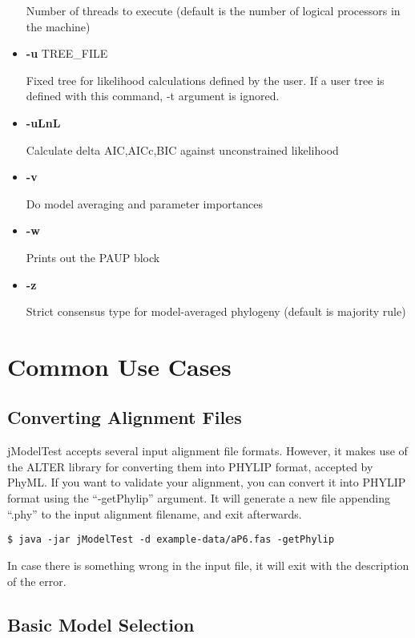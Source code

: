 \documentclass[11pt,twoside,a4paper]{article}
\begin{document}
\begin{itemize}
Number of threads to execute (default is the number of logical processors in the machine)

\item  {\bf -u} TREE\_FILE

Fixed tree for likelihood calculations defined by the user. If a user tree is defined with this command, -t argument is ignored.

\item  {\bf -uLnL}

Calculate delta AIC,AICc,BIC against unconstrained likelihood

\item  {\bf -v}

Do model averaging and parameter importances

\item  {\bf -w}

Prints out the PAUP block

\item  {\bf -z}

Strict consensus type for model-averaged phylogeny (default is majority rule)

\end{itemize}


\section{Common Use Cases}

\subsection{Converting Alignment Files}

jModelTest accepts several input alignment file formats. However, it makes use of the ALTER library for converting them into PHYLIP format, accepted by PhyML. If you want to validate your alignment, you can convert it into PHYLIP format using the ``-getPhylip'' argument. It will generate a new file appending ``.phy'' to the input alignment filename, and exit afterwards.

\begin{lstlisting}
$ java -jar jModelTest -d example-data/aP6.fas -getPhylip
\end{lstlisting}

In case there is something wrong in the input file, it will exit with the description of the error.

\subsection{Basic Model Selection}
\end{document}
